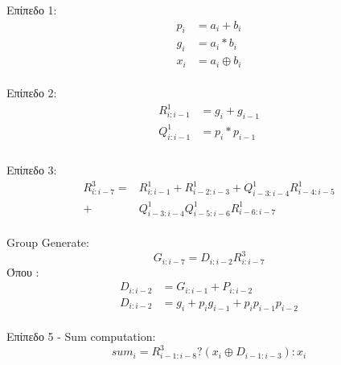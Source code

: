 Επίπεδο 1:\\
\begin{equation}
\begin{split}
p_i &= a_i + b_i\\
g_i &= a_i * b_i\\
x_i &= a_i \oplus b_i
\end{split}
\end{equation}
\\
Επίπεδο 2:\\
\begin{equation}
\begin{split}
R^1_{i:i-1} &= g_i + g_{i-1}\\
Q^1_{i:i-1} &= p_i * p_{i-1}\\
\end{split}
\end{equation}
\\
Επίπεδο 3:\\
\begin{equation}
\begin{split}
R^3_{i:i-7} =& R^1_{i:i-1} + R^1_{i-2:i-3} + Q^1_{i-3:i-4} R^1_{i-4:i-5} \\
            +& Q^1_{i-3:i-4} Q^1_{i-5:i-6} R^1_{i-6:i-7} 
\end{split}
\end{equation}
\\
Group Generate:\\
\begin{equation}
G_{i:i-7} = D_{i:i-2} R^3_{i:i-7}
\end{equation}
Όπου : 
\begin{equation}
\begin{split}
D_{i:i-2} &= G_{i:i-1} + P_{i:i-2}\\
D_{i:i-2} &= g_i + p_ig_{i-1} + p_ip_{i-1}p_{i-2}
\end{split}
\end{equation}
\\
Επίπεδο 5 - Sum computation:\\
\begin{equation}
sum_i = R^3_{i-1:i-8} ? (x_i \oplus D_{i-1:i-3}) : x_i
\end{equation}






